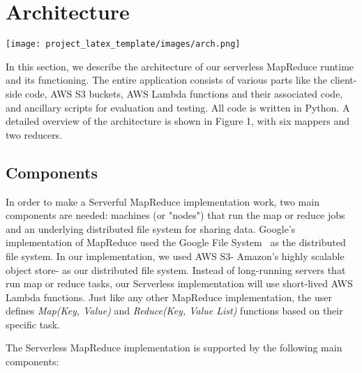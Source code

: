 \section{Architecture}

\begin{figure*}[!t]
\centering
\texttt{[image: project\_latex\_template/images/arch.png]}
\label{fig:arch}
\end{figure*}

In this section, we describe the architecture of our serverless MapReduce runtime and its functioning. The entire application consists of various parts like the client-side code, AWS S3 buckets, AWS Lambda functions and their associated code, and ancillary scripts for evaluation and testing. All code is written in Python. A detailed overview of the architecture is shown in Figure 1, with six mappers and two reducers.

\subsection{Components}

In order to make a Serverful MapReduce implementation work, two main components are needed: machines (or "nodes") that run the map or reduce jobs and an underlying distributed file system for sharing data. Google's implementation of MapReduce used the Google File System~\cite{ghemawat2003google} as the distributed file system. In our implementation, we used AWS S3- Amazon's highly scalable object store- as our distributed file system. Instead of long-running servers that run map or reduce tasks, our Serverless implementation will use short-lived AWS Lambda functions. Just like any other MapReduce implementation, the user defines \emph{Map(Key, Value)} and \emph{Reduce(Key, Value List)} functions based on their specific task.

The Serverless MapReduce implementation is supported by the following main components:


